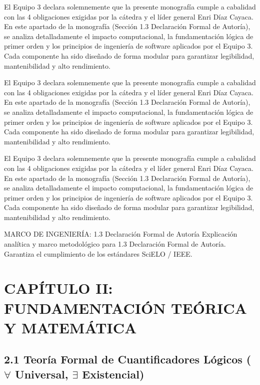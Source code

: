\documentclass[11pt,a4paper]{article}
\begin{document}
El Equipo 3 declara solemnemente que la presente monografía cumple a
cabalidad con las 4 obligaciones exigidas por la cátedra y el líder
general Enri Díaz Cayaca. En este apartado de la monografía (Sección 1.3
Declaración Formal de Autoría), se analiza detalladamente el impacto
computacional, la fundamentación lógica de primer orden y los principios
de ingeniería de software aplicados por el Equipo 3. Cada componente ha
sido diseñado de forma modular para garantizar legibilidad,
mantenibilidad y alto rendimiento.

El Equipo 3 declara solemnemente que la presente monografía cumple a
cabalidad con las 4 obligaciones exigidas por la cátedra y el líder
general Enri Díaz Cayaca. En este apartado de la monografía (Sección 1.3
Declaración Formal de Autoría), se analiza detalladamente el impacto
computacional, la fundamentación lógica de primer orden y los principios
de ingeniería de software aplicados por el Equipo 3. Cada componente ha
sido diseñado de forma modular para garantizar legibilidad,
mantenibilidad y alto rendimiento.

El Equipo 3 declara solemnemente que la presente monografía cumple a
cabalidad con las 4 obligaciones exigidas por la cátedra y el líder
general Enri Díaz Cayaca. En este apartado de la monografía (Sección 1.3
Declaración Formal de Autoría), se analiza detalladamente el impacto
computacional, la fundamentación lógica de primer orden y los principios
de ingeniería de software aplicados por el Equipo 3. Cada componente ha
sido diseñado de forma modular para garantizar legibilidad,
mantenibilidad y alto rendimiento.

\medskip\hrulefill\medskip
 MARCO DE INGENIERÍA: 1.3 Declaración Formal de Autoría
Explicación analítica y marco metodológico para 1.3 Declaración Formal
de Autoría. Garantiza el cumplimiento de los estándares SciELO / IEEE.
\medskip\hrulefill\medskip

\medskip\hrulefill\medskip

\section{CAPÍTULO II: FUNDAMENTACIÓN TEÓRICA Y MATEMÁTICA}

\subsection{2.1 Teoría Formal de Cuantificadores Lógicos ($ \forall $ Universal, $ \exists $ Existencial)}
\end{document}
